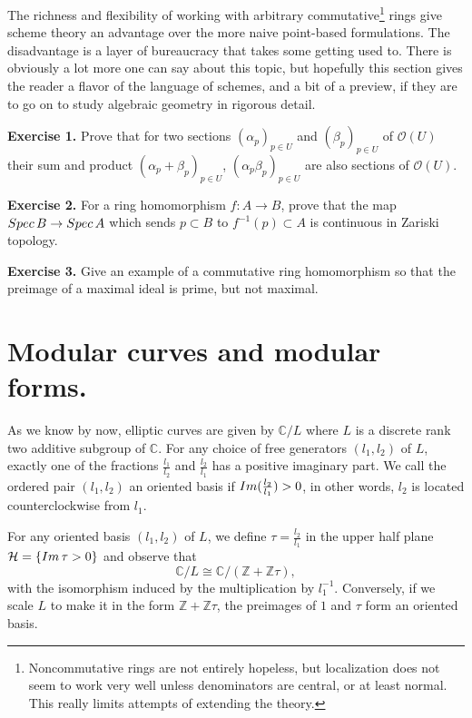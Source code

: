 \documentclass[11pt]{article}
\numberwithin{equation}{section}
\numberwithin{footnote}{section}
\newcommand{\Z}{{\mathbb Z}}
\newcommand{\C}{{\mathbb C}}
\begin{document}
\smallskip
The richness and flexibility of working with arbitrary commutative\footnote{ Noncommutative rings are not entirely hopeless, but localization does not seem to work very well unless denominators are central, or at least normal. This really limits attempts of extending the theory.} rings give scheme theory an advantage over the more naive point-based formulations. The disadvantage is a layer of bureaucracy that takes some getting used to.
There is obviously a lot more one can say about this topic, but hopefully this section gives the reader a flavor of the language of schemes, and a bit of a preview, if they are to go on to study algebraic geometry in rigorous detail.


\smallskip
{\bf Exercise 1.} Prove that for two sections $(\alpha_p)_{p\in U}$ and $(\beta_p)_{p\in U}$ of $\mathcal O(U)$ their sum and product 
$(\alpha_p+\beta_p)_{p\in U}$, $(\alpha_p\beta_p)_{p\in U}$ are also sections of $\mathcal O(U)$.

{\bf Exercise 2.} For a ring homomorphism $f:A\to B$, prove that the map 
$
{\rm Spec}\,B\to {\rm Spec}\,A
$
which sends  $p\subset B$ to $f^{-1}(p)\subset A$ is continuous in Zariski topology.

{\bf Exercise 3.} Give an example of a commutative ring homomorphism so that the preimage of a maximal ideal is prime, but not maximal.



\section{Modular curves and modular forms.}
As we know by now, elliptic curves are given by $\C/L$ where $L$ is a discrete rank two additive subgroup of $\C$. 
For any choice of free generators $(l_1,l_2)$ of $L$, exactly one of the fractions $\frac {l_1}{l_2}$ and $\frac{l_2}{l_1}$ has a positive imaginary part. We call the ordered pair $(l_1,l_2)$ an oriented basis if ${\rm Im}(\frac{l_2}{l_1})>0$, in other words, $l_2$ is located counterclockwise from $l_1$. 

\smallskip
For any oriented basis $(l_1,l_2)$ of $L$, we define $\tau = \frac {l_2}{l_1}$ in the upper half plane $\mathcal H =\{{\rm Im}\,\tau>0\}$ and observe that
$$
\C/L \cong \C/(\Z  + \Z \tau),
$$
with the isomorphism induced by the multiplication by $l_1^{-1}$. Conversely, if we scale $L$ to make it in the form $\Z+ \Z\tau$, the preimages of $1$ and $\tau$ form an oriented basis.
\end{document}
